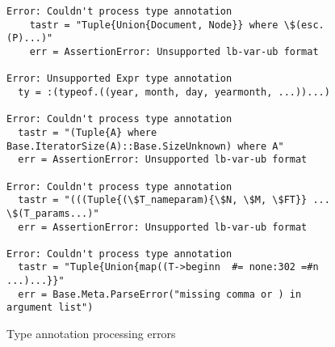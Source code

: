 \begin{figure}
\begin{minipage}{12cm}
\begin{lstlisting}
Error: Couldn't process type annotation
    tastr = "Tuple{Union{Document, Node}} where \$(esc.(P)...)"
    err = AssertionError: Unsupported lb-var-ub format
  
Error: Unsupported Expr type annotation
  ty = :(typeof.((year, month, day, yearmonth, ...))...)
  
Error: Couldn't process type annotation
  tastr = "(Tuple{A} where Base.IteratorSize(A)::Base.SizeUnknown) where A"
  err = AssertionError: Unsupported lb-var-ub format
  
Error: Couldn't process type annotation
  tastr = "(((Tuple{(\$T_nameparam){\$N, \$M, \$FT}} ... \$(T_params...)"
  err = AssertionError: Unsupported lb-var-ub format

Error: Couldn't process type annotation
  tastr = "Tuple{Union{map((T->beginn  #= none:302 =#n ...)...}}"
  err = Base.Meta.ParseError("missing comma or ) in argument list")
\end{lstlisting}
\end{minipage}
\caption{Type annotation processing errors}\label{fig:evaluation-process-errors}
\end{figure}
  
